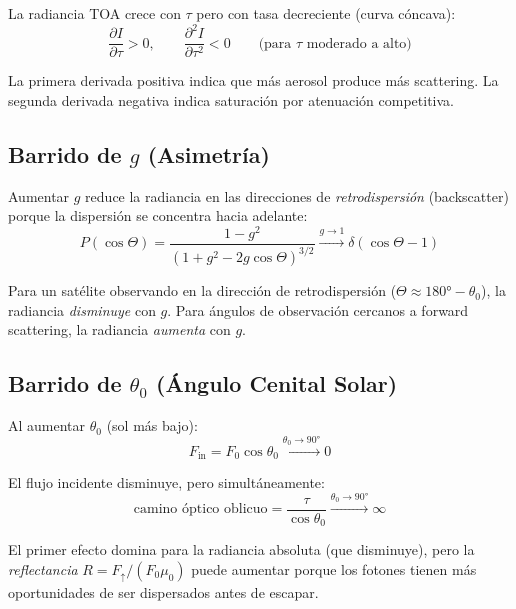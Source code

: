 \documentclass[a4paper,11pt]{article}
\begin{document}
La radiancia TOA crece con $\tau$ pero con tasa decreciente (curva c\'oncava):
\begin{equation}
    \frac{\partial I}{\partial\tau} > 0, \qquad
    \frac{\partial^2 I}{\partial\tau^2} < 0
    \qquad \text{(para $\tau$ moderado a alto)}
\end{equation}

La primera derivada positiva indica que m\'as aerosol produce m\'as scattering.
La segunda derivada negativa indica saturaci\'on por atenuaci\'on competitiva.

\subsection{Barrido de $g$ (Asimetr\'ia)}

Aumentar $g$ reduce la radiancia en las direcciones de \emph{retrodispersi\'on}
(backscatter) porque la dispersi\'on se concentra hacia adelante:
\begin{equation}
    P(\cos\Theta) = \frac{1-g^2}{(1+g^2-2g\cos\Theta)^{3/2}}
    \xrightarrow{g \to 1} \delta(\cos\Theta - 1)
\end{equation}

Para un sat\'elite observando en la direcci\'on de retrodispersi\'on
($\Theta \approx 180° - \theta_0$), la radiancia \emph{disminuye} con $g$.
Para \'angulos de observaci\'on cercanos a forward scattering, la radiancia
\emph{aumenta} con $g$.

\subsection{Barrido de $\theta_0$ (\'Angulo Cenital Solar)}

Al aumentar $\theta_0$ (sol m\'as bajo):
\begin{equation}
    F_{\text{in}} = F_0\cos\theta_0 \xrightarrow{\theta_0 \to 90°} 0
\end{equation}

El flujo incidente disminuye, pero simult\'aneamente:
\begin{equation}
    \text{camino \'optico oblicuo} = \frac{\tau}{\cos\theta_0}
    \xrightarrow{\theta_0 \to 90°} \infty
\end{equation}

El primer efecto domina para la radiancia absoluta (que disminuye), pero la
\emph{reflectancia} $R = F_\uparrow/(F_0\mu_0)$ puede aumentar porque los
fotones tienen m\'as oportunidades de ser dispersados antes de escapar.
\end{document}
